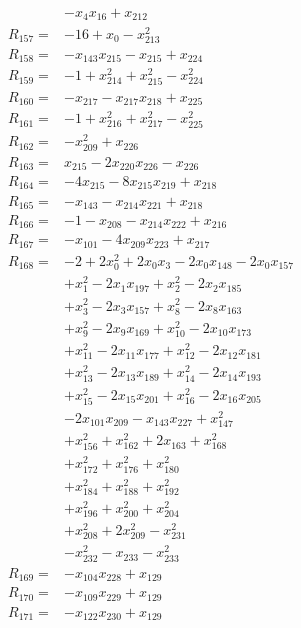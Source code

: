 \begin{align*}
&-x_{4}x_{16} +x_{212}\\[3pt]
R_{157}={}&-16 +x_{0} -x_{213}^{2}\\[3pt]
R_{158}={}&-x_{143}x_{215} -x_{215} +x_{224}\\[3pt]
R_{159}={}&-1 +x_{214}^{2} +x_{215}^{2} -x_{224}^{2}\\[3pt]
R_{160}={}&-x_{217} -x_{217}x_{218} +x_{225}\\[3pt]
R_{161}={}&-1 +x_{216}^{2} +x_{217}^{2} -x_{225}^{2}\\[3pt]
R_{162}={}&-x_{209}^{2} +x_{226}\\[3pt]
R_{163}={}&x_{215} -2x_{220}x_{226} -x_{226}\\[3pt]
R_{164}={}&-4x_{215} -8x_{215}x_{219} +x_{218}\\[3pt]
R_{165}={}&-x_{143} -x_{214}x_{221} +x_{218}\\[3pt]
R_{166}={}&-1 -x_{208} -x_{214}x_{222} +x_{216}\\[3pt]
R_{167}={}&-x_{101} -4x_{209}x_{223} +x_{217}\\[3pt]
R_{168}={}&-2 +2x_{0}^{2} +2x_{0}x_{3} -2x_{0}x_{148} -2x_{0}x_{157}\\
&+x_{1}^{2} -2x_{1}x_{197} +x_{2}^{2} -2x_{2}x_{185}\\
&+x_{3}^{2} -2x_{3}x_{157} +x_{8}^{2} -2x_{8}x_{163}\\
&+x_{9}^{2} -2x_{9}x_{169} +x_{10}^{2} -2x_{10}x_{173}\\
&+x_{11}^{2} -2x_{11}x_{177} +x_{12}^{2} -2x_{12}x_{181}\\
&+x_{13}^{2} -2x_{13}x_{189} +x_{14}^{2} -2x_{14}x_{193}\\
&+x_{15}^{2} -2x_{15}x_{201} +x_{16}^{2} -2x_{16}x_{205}\\
&-2x_{101}x_{209} -x_{143}x_{227} +x_{147}^{2}\\
&+x_{156}^{2} +x_{162}^{2} +2x_{163} +x_{168}^{2}\\
&+x_{172}^{2} +x_{176}^{2} +x_{180}^{2}\\
&+x_{184}^{2} +x_{188}^{2} +x_{192}^{2}\\
&+x_{196}^{2} +x_{200}^{2} +x_{204}^{2}\\
&+x_{208}^{2} +2x_{209}^{2} -x_{231}^{2}\\
&-x_{232}^{2} -x_{233} -x_{233}^{2}\\[3pt]
R_{169}={}&-x_{104}x_{228} +x_{129}\\[3pt]
R_{170}={}&-x_{109}x_{229} +x_{129}\\[3pt]
R_{171}={}&-x_{122}x_{230} +x_{129}\\[3pt]

\end{align*}

